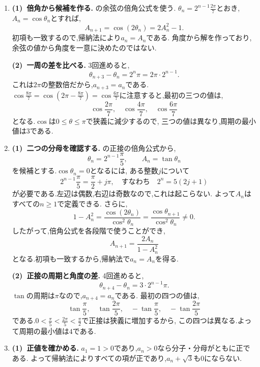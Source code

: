 \begin{enumerate}[label=\textbf{問\arabic*.},leftmargin=3.8em,format=\bookitemlink{practice-special}{solution}{problem}]
    \smallskip
    \textbf{(2)~指数を3倍する.}
    $a_1=2+2^{-1}$に合う候補を
    \[
      A_n=2^{\,3^{n-1}}+2^{-3^{n-1}}
    \]
    とする.(1)に$u=2^{\,3^{n-1}}$を代入すると,
    \[
      A_{n+1}=A_n^3-3A_n
    \]
    となる.初項とが一致するので,帰納法より$a_n=A_n$である.
    $-3a_n$の項が交差項を正確に打ち消すため,同じ対称式の形を保って次へ進める.
  \item \textbf{(1)~倍角から候補を作る.}
    の余弦の倍角公式を使う.
    $\theta_n=2^{n-1}\frac{2\pi}{7}$とおき,
    $A_n=\cos\theta_n$とすれば,
    \[
      A_{n+1}=\cos(2\theta_n)=2A_n^2-1.
    \]
    初項も一致するので,帰納法により$a_n=A_n$である.
    角度から解を作っており,余弦の値から角度を一意に決めたのではない.

    \smallskip
    \textbf{(2)~一周の差を比べる.}
    3回進めると,
    \[
      \theta_{n+3}-\theta_n=2^n\pi
      =2\pi\cdot2^{n-1}.
    \]
    これは$2\pi$の整数倍だから,$a_{n+3}=a_n$である.
    $\cos\frac{8\pi}{7}=\cos\left(2\pi-\frac{8\pi}{7}\right)=\cos\frac{6\pi}{7}$に注意すると,最初の三つの値は,
    \[
      \cos\frac{2\pi}{7},\quad
      \cos\frac{4\pi}{7},\quad
      \cos\frac{6\pi}{7}
    \]
    となる.$\cos$は$0\le\theta\le\pi$で狭義に減少するので,
    三つの値は異なり,周期の最小値は$3$である.
  \item \textbf{(1)~二つの分母を確認する.}
    の正接の倍角公式から,
    \[
      \theta_n=2^{n-1}\frac\pi5,\qquad A_n=\tan\theta_n
    \]
    を候補とする.$\cos\theta_n=0$となるには,
    ある整数$j$について
    \[
      2^{n-1}\frac\pi5=\frac\pi2+j\pi,
      \quad\text{すなわち}\quad 2^n=5(2j+1)
    \]
    が必要である.左辺は偶数,右辺は奇数なので,これは起こらない.
    よって$A_n$はすべての$n\ge1$で定義できる.
    さらに,
    \[
      1-A_n^2=\frac{\cos(2\theta_n)}{\cos^2\theta_n}
      =\frac{\cos\theta_{n+1}}{\cos^2\theta_n}\ne0.
    \]
    したがって,倍角公式を各段階で使うことができ,
    \[
      A_{n+1}=\frac{2A_n}{1-A_n^2}
    \]
    となる.初項も一致するから,帰納法で$a_n=A_n$を得る.

    \smallskip
    \textbf{(2)~正接の周期と角度の差.}
    4回進めると,
    \[
      \theta_{n+4}-\theta_n=3\cdot2^{n-1}\pi.
    \]
    $\tan$の周期は$\pi$なので,$a_{n+4}=a_n$である.
    最初の四つの値は,
    \[
      \tan\frac\pi5,\quad \tan\frac{2\pi}{5},\quad
      -\tan\frac\pi5,\quad -\tan\frac{2\pi}{5}
    \]
    である.$0<\frac\pi5<\frac{2\pi}{5}<\frac\pi2$で正接は狭義に増加するから,
    この四つは異なる.よって周期の最小値は$4$である.
  \item \textbf{(1)~正値を確かめる.}
    $a_1=1>0$であり,$a_n>0$なら分子・分母がともに正である.
    よって帰納法によりすべての項が正であり,$a_n+\sqrt3$も$0$にならない.


\end{enumerate}
